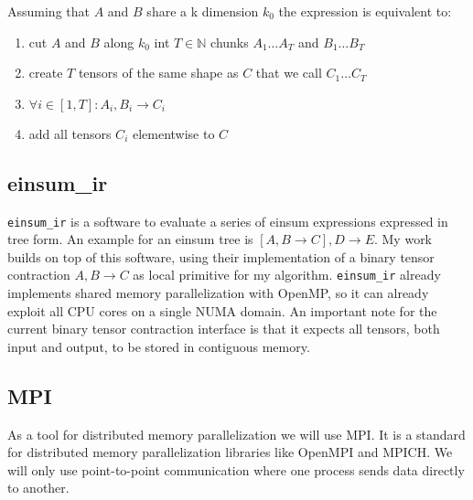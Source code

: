 Assuming that $A$ and $B$ share a k dimension $k_0$ the expression is equivalent to:
\begin{enumerate}
  \item cut $A$ and $B$ along $k_0$ int $T \in \mathbb{N}$ chunks $A_1 \dots A_T$ and $B_1 \dots B_T$
  \item create $T$ tensors of the same shape as $C$ that we call $C_1 \dots C_T$
  \item $\forall i \in [1,T]: A_i, B_i \rightarrow C_i$
  \item add all tensors $C_i$ elementwise to $C$
\end{enumerate}


\subsection{einsum\_ir}
\label{sec:einsum_ir}

\texttt{einsum\_ir}\cite{einsum_ir} is a software to evaluate a series of einsum expressions expressed in tree form.
An example for an einsum tree is $[A,B\rightarrow C],D \rightarrow E$.
My work builds on top of this software, using their implementation of a binary tensor contraction $A,B \rightarrow C$ as local primitive for my algorithm.
\texttt{einsum\_ir} already implements shared memory parallelization with OpenMP\cite{openMP}, so it can already exploit all CPU cores on a single NUMA domain.
An important note for the current binary tensor contraction interface is that it expects all tensors, both input and output, to be stored in contiguous memory.

\subsection{MPI}

As a tool for distributed memory parallelization we will use MPI.
It is a standard for distributed memory parallelization libraries like OpenMPI and MPICH.
We will only use point-to-point communication where one process sends data directly to another.